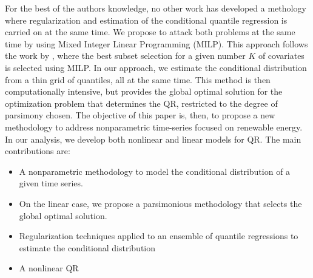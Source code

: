  
For the best of the authors knowledge, no other work has developed a methology where regularization and estimation of the conditional quantile regression is carried on at the same time.
We propose to attack both problems at the same time by using Mixed Integer Linear Programming (MILP). This approach follows the work by \cite{bertsimas_best_2015}, where the best subset selection for a given number $K$ of covariates is selected using MILP. In our approach, we estimate the conditional distribution from a thin grid of quantiles, all at the same time. This method is then computationally intensive, but provides the global optimal solution for the optimization problem that determines the QR, restricted to the degree of parsimony chosen.
The objective of this paper is, then, to propose a new methodology to address nonparametric time-series focused on renewable energy. In our analysis, we develop both nonlinear and linear models for QR. The main contributions are:
\begin{itemize}
	\item A nonparametric methodology to model the conditional distribution of a given time series.
	
	\item On the linear case, we propose a parsimonious methodology that selects the global optimal solution.
	
	\item Regularization techniques applied to an ensemble of quantile regressions to estimate the conditional distribution
	
	\item A nonlinear QR
	
\end{itemize}





